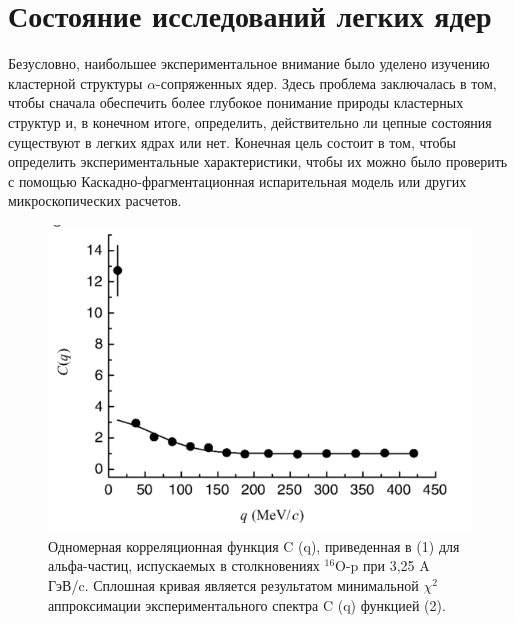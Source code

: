 \documentclass[fontsize=14pt]{scrreport}
\begin{document}
\section{ Состояние исследований легких ядер}
\hspace{0.6cm}
Безусловно, наибольшее экспериментальное внимание было уделено изучению кластерной структуры $\alpha$-сопряженных ядер. Здесь проблема заключалась в том, чтобы сначала обеспечить более глубокое понимание природы кластерных структур и, в конечном итоге, определить, действительно ли цепные состояния существуют в легких ядрах или нет. Конечная цель состоит в том, чтобы определить экспериментальные характеристики, чтобы их можно было проверить с помощью Каскадно-фрагментационная испарительная модель или других микроскопических расчетов.

\begin{figure}[!ht]
\centerline{\includegraphics[scale=.6]{picture8.png}}
\caption{Одномерная корреляционная функция C (q), приведенная в (1) для альфа-частиц, испускаемых в столкновениях $^{16}$O-p при 3,25 A ГэВ/c. Сплошная кривая является результатом минимальной $\chi^{2}$ аппроксимации экспериментального спектра C (q) функцией (2).}
\label{fig12}
\end{figure}
\end{document}
